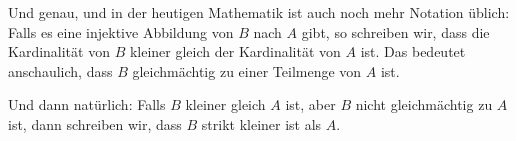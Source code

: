 \begin{spoken-clean}[00:18:44 - 00:23:33]
Und genau, und in der heutigen Mathematik ist auch noch mehr Notation üblich: Falls es eine injektive Abbildung von $B$ nach $A$ gibt, so schreiben wir, dass die Kardinalität von $B$ kleiner gleich der Kardinalität von $A$ ist. Das bedeutet anschaulich, dass $B$ gleichmächtig zu einer Teilmenge von $A$ ist.

Und dann natürlich: Falls $B$ kleiner gleich $A$ ist, aber $B$ nicht gleichmächtig zu $A$ ist, dann schreiben wir, dass $B$ strikt kleiner ist als $A$.
\end{spoken-clean}

\begin{math-stroke}
\end{math-stroke}

